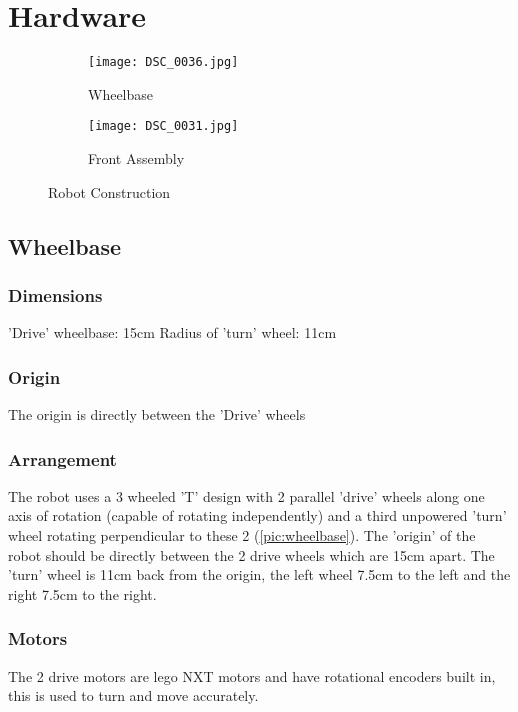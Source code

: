 \section{Hardware}

\begin{figure}[H]
\begin{subfigure}{.45\textwidth}
\centering
\texttt{[image: DSC\_0036.jpg]}
\caption{Wheelbase}
\label{pic:wheelbase}
\end{subfigure}
\begin{subfigure}{.45\textwidth}
\centering
\texttt{[image: DSC\_0031.jpg]}
\caption{Front Assembly}
\label{pic:front}
\end{subfigure}
\caption{Robot Construction}
\label{pic:construction}
\end{figure}

\subsection{Wheelbase}
\subsubsection{Dimensions}
'Drive' wheelbase:		15cm \newline
Radius of 'turn' wheel: 11cm
\subsubsection{Origin}
The origin is directly between the 'Drive' wheels
\subsubsection{Arrangement}
The robot uses a 3 wheeled 'T' design with 2 parallel 'drive' wheels along one axis of rotation (capable of rotating independently) and a third unpowered 'turn' wheel rotating perpendicular to these 2 (\autoref{pic:wheelbase}). The 'origin' of the robot should be 
directly between the 2 drive wheels which are 15cm apart. The 'turn' wheel 
is 11cm back from the origin, the left wheel 7.5cm to the left and the right
7.5cm to the right. 

\subsubsection{Motors}
The 2 drive motors are lego NXT motors and have rotational encoders built in, this is used to turn and move accurately. 



